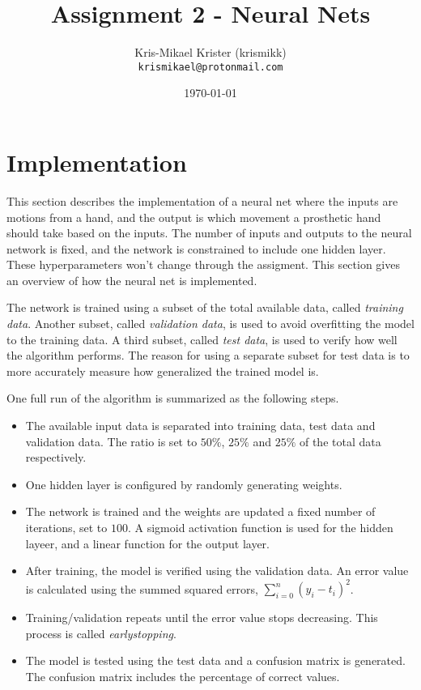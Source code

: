 \documentclass{article}
\title{Assignment 2 - Neural Nets}
\author{Kris-Mikael Krister (krismikk)\\\texttt{krismikael@protonmail.com}}
\date{\today}
\begin{document}
\maketitle

\section*{Implementation}

This section describes the implementation of a neural net where the inputs are motions from a hand, and the output is which movement a prosthetic hand should take based on the inputs. The number of inputs and outputs to the neural network is fixed, and the network is constrained to include one hidden layer. These hyperparameters won't change through the assigment. This section gives an overview of how the neural net is implemented.

The network is trained using a subset of the total available data, called \emph{training data}. Another subset, called \emph{validation data}, is used to avoid overfitting the model to the training data. A third subset, called \emph{test data}, is used to verify how well the algorithm performs. The reason for using a separate subset for test data is to more accurately measure how generalized the trained model is.

One full run of the algorithm is summarized as the following steps.

\begin{itemize}
    \item The available input data is separated into training data, test data and validation data. The ratio is set to $50\%$, $25\%$ and $25\%$ of the total data respectively.
    \item One hidden layer is configured by randomly generating weights.
    \item The network is trained and the weights are updated a fixed number of iterations, set to $100$. A sigmoid activation function is used for the hidden layeer, and a linear function for the output layer.
    \item After training, the model is verified using the validation data. An error value is calculated using the summed squared errors, $\sum_{i=0}^{n}(y_i - t_i)^2$.
    \item Training/validation repeats until the error value stops decreasing. This process is called \emph{earlystopping}.
    \item The model is tested using the test data and a confusion matrix is generated. The confusion matrix includes the percentage of correct values.
\end{itemize}
\end{document}

